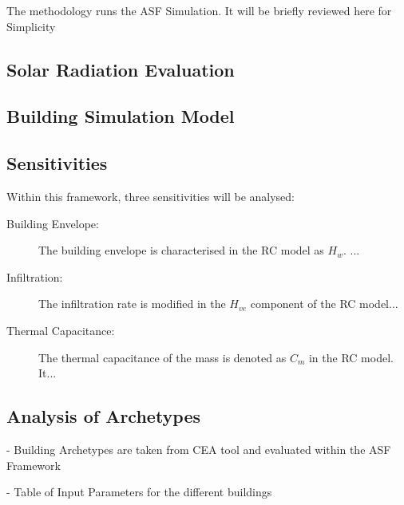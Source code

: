 

The methodology runs the ASF Simulation. It will be briefly reviewed here for Simplicity 


\subsection{Solar Radiation Evaluation}
\label{ch:rad}



\subsection{Building Simulation Model}
\label{ch:sim}

\subsection{Sensitivities}

Within this framework, three sensitivities will be analysed:

\begin{description}

\item[Building Envelope:] The building envelope is characterised in the RC model as $H_w$. ...
\item[Infiltration:] The infiltration rate is modified in the $H_{ve}$ component of the RC model...
\item[Thermal Capacitance:] The thermal capacitance of the mass is denoted as $C_m$ in the RC model. It...

\end{description}


\subsection{Analysis of Archetypes}

- Building Archetypes are taken from CEA tool and evaluated within the ASF Framework

- Table of Input Parameters for the different buildings




